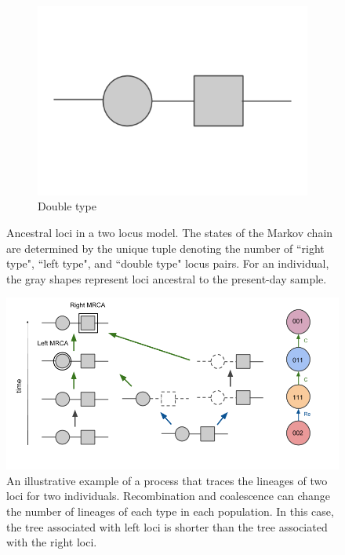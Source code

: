 \documentclass[11pt,oneside]{amsart}
\begin{document}
\begin{figure}[ht]
\begin{subfigure}{.3\textwidth}
        \includegraphics[width=\linewidth]{Double_type.png}
        \caption{Double type}
    \end{subfigure} 
\caption{Ancestral loci in a two locus model. The states of the Markov chain are determined by the unique tuple denoting the number of ``right type", ``left type", and ``double type" locus pairs. For an individual, the gray shapes represent loci ancestral to the present-day sample.} 
\label{Figure: terminology}
\end{figure}

\begin{figure}[ht]
\centering
\includegraphics[width=1.00\textwidth]{Recombination_diagram.png}
\caption{An illustrative example of a process that traces the lineages of two loci for two individuals. Recombination and coalescence can change the number of lineages of each type in each population. In this case, the tree associated with left loci is shorter than the tree associated with the right loci.}
\label{Figure: recombination diagram}
\end{figure}
\end{document}
